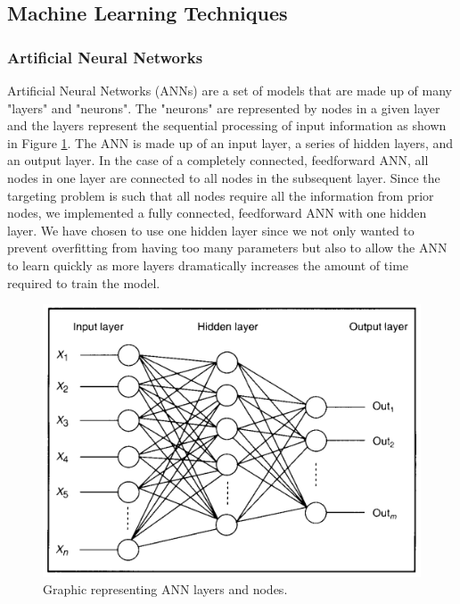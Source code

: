 \documentclass[11pt,letterpaper]{article}
\begin{document}
\subsection{Machine Learning Techniques}
\subsubsection{Artificial Neural Networks}
Artificial Neural Networks (ANNs) are a set of models that are made up of many "layers" and "neurons". The "neurons" are represented by nodes in a given layer and the layers represent the sequential processing of input information as shown in Figure \ref{fig:NN}. The ANN is made up of an input layer, a series of hidden layers, and an output layer. In the case of a completely connected, feedforward ANN, all nodes in one layer are connected to all nodes in the subsequent layer. Since the targeting problem is such that all nodes require all the information from prior nodes, we implemented a fully connected, feedforward ANN with one hidden layer. We have chosen to use one hidden layer since we not only wanted to prevent overfitting from having too many parameters but also to allow the ANN to learn quickly as more layers dramatically increases the amount of time required to train the model.

\begin{figure}[h]
	\centering
	\includegraphics[scale = 0.8]{NN.png}
	\caption{Graphic representing ANN layers and nodes. }
	\label{fig:NN}
\end{figure}
\end{document}
